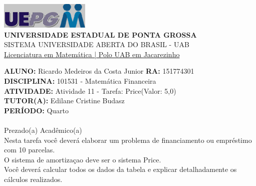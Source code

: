 \documentclass[a4paper, 12pt]{article}
\begin{document}
\begin{flushleft}\includegraphics{logo}\\
\textbf{UNIVERSIDADE ESTADUAL DE PONTA GROSSA} \\
SISTEMA UNIVERSIDADE ABERTA DO BRASIL - UAB \\
\underline{Licenciatura em Matemática | Polo UAB em Jacarezinho}\end{flushleft} 
\textbf{ALUNO:} Ricardo Medeiros da Costa Junior   \textbf{RA:} 151774301 \\
\textbf{DISCIPLINA:} 101531 - Matemática Financeira \\
\textbf{ATIVIDADE:} Atividade 11 - Tarefa: Price(Valor: 5,0) \\ 
\textbf{TUTOR(A):} Edilane Cristine Budasz \\
\textbf{PERÍODO:} Quarto \\\\
Prezado(a) Acadêmico(a)\\

Nesta tarefa você deverá elaborar um problema de financiamento ou empréstimo com 10 parcelas.\\

O sistema de amortizaçao deve ser o sistema Price.\\

Você deverá calcular todos os dados da tabela e explicar detalhadamente os cálculos realizados.\\\\\\
\end{document}
